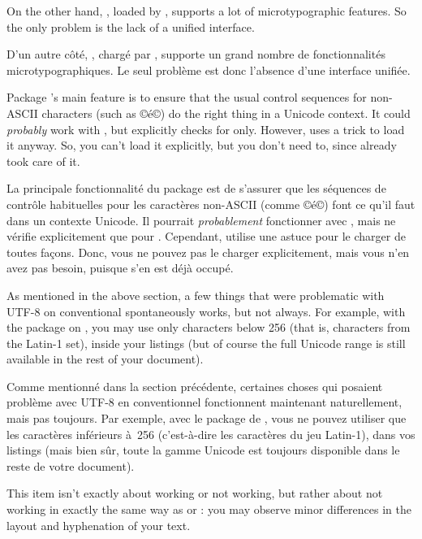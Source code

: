 \documentclass{lltxdoc}
\begin{document}
{On the other hand, , loaded by , supports a lot of
microtypographic features. So the only problem is the lack of a unified
interface.

D'un autre côté, , chargé par , supporte un grand nombre de fonctionnalités microtypographiques. Le seul problème est donc l'absence d'une interface unifiée.

Package 's main feature is to ensure that the usual control
sequences for non-ASCII characters (such as ©\'e©) do the right thing in a
Unicode context. It could \emph{probably} work with \luatex, but explicitly
checks for \xetex only. However,  uses a trick to load it anyway.
So, you can't load it explicitly, but you don't need to, since 
already took care of it.

La principale fonctionnalité du package  est de s'assurer que les séquences de contrôle habituelles pour les caractères non-ASCII (comme ©\'e©) font ce qu'il faut dans un contexte Unicode. Il pourrait \emph{probablement} fonctionner avec \luatex, mais ne vérifie explicitement que pour \xetex. Cependant,  utilise une astuce pour le charger de toutes façons. Donc, vous ne pouvez pas le charger explicitement, mais vous n'en avez pas besoin, puisque  s'en est déjà occupé.

As mentioned in the above section, a few things that were problematic with
UTF-8 on conventional \latex spontaneously works, but not always. For example,
with the  package on \lualatex, you may use only characters below
256 (that is, characters from the Latin-1 set), inside your listings (but of
course the full Unicode range is still available in the rest of your document).

Comme mentionné dans la section précédente, certaines choses qui posaient problème avec UTF-8 en \latex conventionnel fonctionnent maintenant naturellement, mais pas toujours. Par exemple, avec le package  de \lualatex, vous ne pouvez utiliser que les caractères inférieurs à~256 (c'est-à-dire les caractères du jeu Latin-1), dans vos listings (mais bien sûr, toute la gamme Unicode est toujours disponible dans le reste de votre document).

This item isn't exactly about working or not working, but rather about not
working in exactly the same way as \pdftex or \xetex: you may observe minor
differences in the layout and hyphenation of your text.

}
\end{document}

